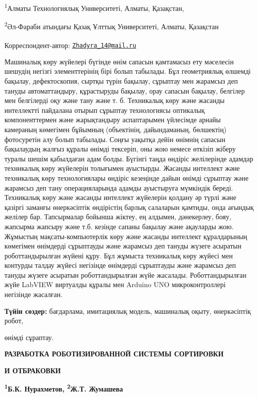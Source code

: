 \textsuperscript{1}Алматы Технологиялық Университеті, Алматы, Қазақстан,

\textsuperscript{2}Әл-Фараби атындағы Қазақ Ұлттық Университеті, Алматы,
Қазақстан

{\bfseries \textsuperscript{\envelope }}Корреспондент-автор:
\href{mailto:Zhadyra_14@mail.ru}{\nolinkurl{Zhadyra\_14@mail.ru}}

Машиналық көру жүйелері бүгінде өнім сапасын қамтамасыз ету мәселесін
шешудің негізгі элементтерінің бірі болып табылады. Бұл геометриялық
өлшемді бақылау, дефектоскопия, сыртқы түрін бақылау, сұрыптау мен
жарамсыз деп тануды автоматтандыру, құрастыруды бақылау, орау сапасын
бақылау, белгілер мен белгілерді оқу және тану және т. б. Техникалық
көру және жасанды интеллектті пайдалана отырып сұрыптау технологиясы
оптикалық компоненттермен және жарықтандыру аспаптарымен үйлесімде
арнайы камераның көмегімен бұйымның (объектінің, дайындаманың,
бөлшектің) фотосуретін алу болып табылады. Соңғы уақытқа дейін өнімнің
сапасын бақылаудың жалғыз құралы өнімді тексеріп, оны жою немесе өткізіп
жіберу туралы шешім қабылдаған адам болды. Бүгінгі таңда өндіріс
желілерінде адамдар техникалық көру жүйелерін толығымен ауыстырды.
Жасанды интеллект және техникалық көру технологиялары өндіріс кезеңінде
дайын өнімді сұрыптау және жарамсыз деп тану операцияларында адамды
ауыстыруға мүмкіндік береді. Техникалық көру және жасанды интеллект
жүйелерін қолдану әр түрлі және қазіргі заманғы өнеркәсіптік өндірістің
барлық салаларын қамтиды, онда ағындық желілер бар. Тапсырмалар бойынша
жіктеу, ең алдымен, дәнекерлеу, бояу, жапсырма жапсыру және т.б. кезінде
сапаны бақылау және ақауларды жою. Жұмыстың мақсаты-компьютерлік көру
және жасанды интеллект құралдарының көмегімен өнімдерді сұрыптауды және
жарамсыз деп тануды жүзеге асыратын роботтандырылған жүйені құру. Бұл
жұмыста техникалық көру жүйесі мен контурды талдау жүйесі негізінде
өнімдерді сұрыптауды және жарамсыз деп тануды жүзеге асыратын
роботтандырылған жүйе жасалады. Роботтандырылған жүйе LabVIEW виртуалды
құралы мен Arduino UNO микроконтроллері негізінде жасалған.

{\bfseries Түйін сөздер:} бағдарлама, имитациялық модель, машиналық оқыту,
өнеркәсіптіқ робот,

өнімді сұраптау.

{\bfseries РАЗРАБОТКА РОБОТИЗИРОВАННОЙ СИСТЕМЫ СОРТИРОВКИ}

{\bfseries И ОТБРАКОВКИ}

{\bfseries \textsuperscript{1}Б.К. Нурахметов, \textsuperscript{2}Ж.Т.
Жумашева\textsuperscript{\envelope }}

